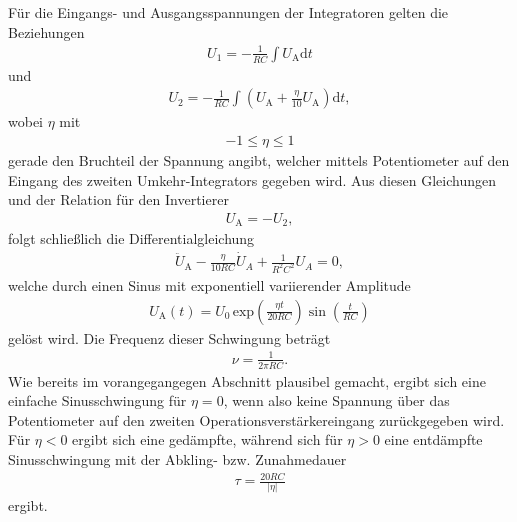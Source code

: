 Für die Eingangs- und Ausgangsspannungen der Integratoren gelten die Beziehungen
\begin{align}
  U_1 = - \frac1{RC} \int U_\text{A} \mathrm{d}t
\end{align}
und
\begin{align}
  U_2 = - \frac1{RC} \int \left(U_\text{A} +\frac{\eta}{10} U_\text{A} \right) \mathrm{d}t,
\end{align}
wobei $\eta$ mit
\begin{align}
  -1 \leq \eta \leq 1
\end{align}
gerade den Bruchteil der Spannung angibt, welcher mittels Potentiometer auf den Eingang des
zweiten Umkehr-Integrators gegeben wird. Aus diesen Gleichungen und der Relation für den Invertierer
\begin{align}
  U_\text{A} = - U_2,
\end{align}
folgt schließlich die Differentialgleichung
\begin{align}
  \ddot{U}_\text{A} - \frac{\eta}{10 RC} \dot{U}_A + \frac1{R^2 C^2} U_A = 0,
\end{align}
welche durch einen Sinus mit exponentiell variierender Amplitude
\begin{align}
  U_\text{A}(t) = U_0 \, \text{exp} \left( \frac{\eta t}{20 RC} \right) \sin \left( \frac{t}{RC} \right)
\end{align}
gelöst wird. Die Frequenz dieser Schwingung beträgt
\begin{align}
  \nu = \frac1{2 \pi R C}.
  \label{eqn:freqexp}
\end{align}
Wie bereits im vorangegangegen Abschnitt plausibel gemacht, ergibt sich eine einfache
Sinusschwingung für $\eta = 0$, wenn also keine Spannung über das Potentiometer auf den zweiten
Operationsverstärkereingang zurückgegeben wird. Für $\eta < 0$ ergibt sich eine gedämpfte, während sich für
$\eta > 0$ eine entdämpfte Sinusschwingung mit der Abkling- bzw. Zunahmedauer
\begin{align}
  \tau = \frac{20 RC}{\lvert\eta\rvert}
  \label{eqn:tauentdämpft}
\end{align}
ergibt.
